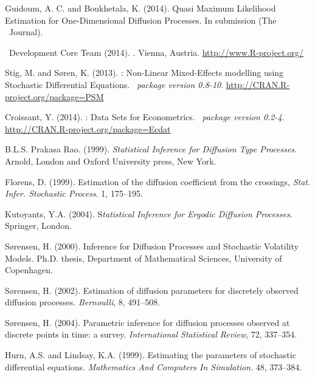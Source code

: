 \begin{thebibliography}{1}
Guidoum, A. C. and Boukhetala, K. (2014).
\newblock Quasi Maximum Likelihood Estimation for One-Dimensional Diffusion Processes.
\newblock In submission (The \R~Journal).

\R~Development Core Team (2014).
.
\newblock Vienna, Austria.
\newblock \url{http://www.R-project.org/}

Stig, M. and S{\o}ren, K. (2013).
\newblock {}: Non-Linear Mixed-Effects modelling using Stochastic Differential Equations.
\newblock \emph{\R~package version 0.8-10}.
\newblock \url{http://CRAN.R-project.org/package=PSM}

Croissant, Y. (2014).
\newblock {}: Data Sets for Econometrics.
\newblock \emph{\R~package version 0.2-4}.
\newblock \url{http://CRAN.R-project.org/package=Ecdat}

B.L.S. Prakasa Rao. (1999).
\newblock \emph{Statistical Inference for Diffusion Type Processes}.
\newblock Arnold, London and Oxford University press, New York.

Florens, D. (1999).
\newblock Estimation of the diffusion coefficient from the crossings,
\newblock \emph{Stat. Infer. Stochastic Process}. 1, 175--195.

Kutoyants, Y.A. (2004).
\newblock S\emph{tatistical Inference for Ergodic Diffusion Processes}.
\newblock Springer, London.

S{\o}rensen, H. (2000).
\newblock Inference for Diffusion Processes and Stochastic Volatility Models.
\newblock Ph.D. thesis, Department of Mathematical Sciences, University of Copenhagen.

S{\o}rensen, H. (2002).
\newblock Estimation of diffusion parameters for discretely observed diffusion processes.
\newblock \emph{Bernoulli}, 8, 491--508.

S{\o}rensen, H. (2004).
\newblock Parametric inference for diffusion processes observed at discrete points in time: a survey.
\newblock \emph{International Statistical Review}, 72, 337--354.

Hurn, A.S. and Lindsay, K.A. (1999).
\newblock Estimating the parameters of stochastic differential equations.
\newblock \emph{Mathematics And Computers In Simulation}. 48, 373--384.


\end{thebibliography}
